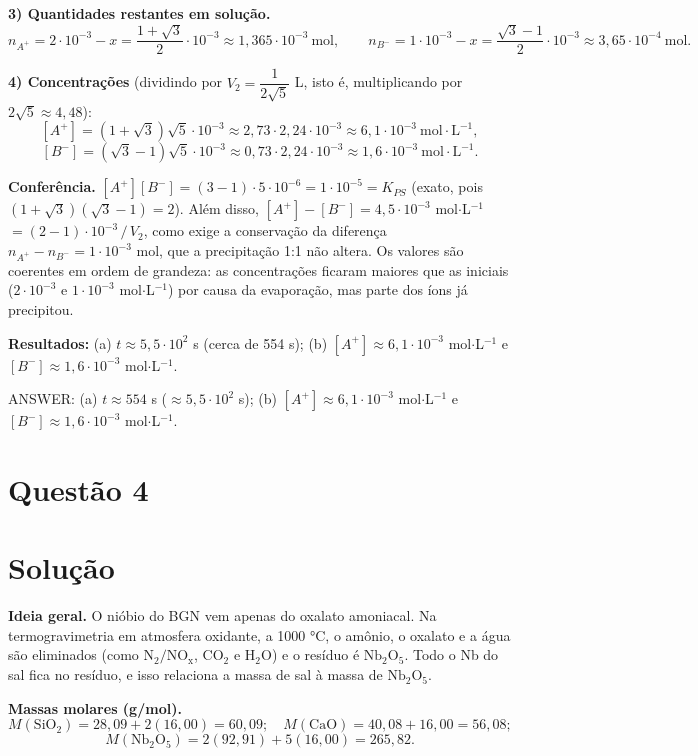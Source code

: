 \documentclass{article}%
\begin{document}
\textbf{3) Quantidades restantes em solução.}
\[
n_{A^+}=2\cdot10^{-3}-x=\frac{1+\sqrt3}{2}\cdot10^{-3}\approx1{,}365\cdot10^{-3}\ \text{mol},\qquad
n_{B^-}=1\cdot10^{-3}-x=\frac{\sqrt3-1}{2}\cdot10^{-3}\approx3{,}65\cdot10^{-4}\ \text{mol}.
\]

\textbf{4) Concentrações} (dividindo por $V_2=\dfrac{1}{2\sqrt5}$ L, isto é, multiplicando por $2\sqrt5\approx4{,}48$):
\[
[A^+]=(1+\sqrt3)\sqrt5\cdot10^{-3}\approx 2{,}73\cdot2{,}24\cdot10^{-3}\approx 6{,}1\cdot10^{-3}\ \text{mol}\cdot\text{L}^{-1},
\]
\[
[B^-]=(\sqrt3-1)\sqrt5\cdot10^{-3}\approx 0{,}73\cdot2{,}24\cdot10^{-3}\approx 1{,}6\cdot10^{-3}\ \text{mol}\cdot\text{L}^{-1}.
\]

\textbf{Conferência.} $[A^+][B^-]=(3-1)\cdot5\cdot10^{-6}=1\cdot10^{-5}=K_{PS}$ (exato, pois $(1+\sqrt3)(\sqrt3-1)=2$). Além disso, $[A^+]-[B^-]=4{,}5\cdot10^{-3}$ mol$\cdot$L$^{-1}$ $=(2-1)\cdot10^{-3}\,/\,V_2$, como exige a conservação da diferença $n_{A^+}-n_{B^-}=1\cdot10^{-3}$ mol, que a precipitação 1:1 não altera. Os valores são coerentes em ordem de grandeza: as concentrações ficaram maiores que as iniciais ($2\cdot10^{-3}$ e $1\cdot10^{-3}$ mol$\cdot$L$^{-1}$) por causa da evaporação, mas parte dos íons já precipitou.

\textbf{Resultados:} (a) $t\approx 5{,}5\cdot10^{2}$ s (cerca de 554 s); (b) $[A^+]\approx6{,}1\cdot10^{-3}$ mol$\cdot$L$^{-1}$ e $[B^-]\approx1{,}6\cdot10^{-3}$ mol$\cdot$L$^{-1}$.

ANSWER: (a) $t \approx 554$ s ($\approx 5{,}5\cdot10^{2}$ s); (b) $[A^+]\approx 6{,}1\cdot10^{-3}$ mol$\cdot$L$^{-1}$ e $[B^-]\approx 1{,}6\cdot10^{-3}$ mol$\cdot$L$^{-1}$.%
\newpage%
\section*{Questão 4}

\section*{Solução}

\textbf{Ideia geral.} O nióbio do BGN vem apenas do oxalato amoniacal. Na termogravimetria em atmosfera oxidante, a 1000 °C, o amônio, o oxalato e a água são eliminados (como $\mathrm{N_2/NO_x}$, $\mathrm{CO_2}$ e $\mathrm{H_2O}$) e o resíduo é $\mathrm{Nb_2O_5}$. Todo o Nb do sal fica no resíduo, e isso relaciona a massa de sal à massa de $\mathrm{Nb_2O_5}$.

\textbf{Massas molares (g/mol).}
\[
M(\mathrm{SiO_2})=28{,}09+2(16{,}00)=60{,}09;\quad M(\mathrm{CaO})=40{,}08+16{,}00=56{,}08;
\]
\[
M(\mathrm{Nb_2O_5})=2(92{,}91)+5(16{,}00)=265{,}82 .
\]
\end{document}
